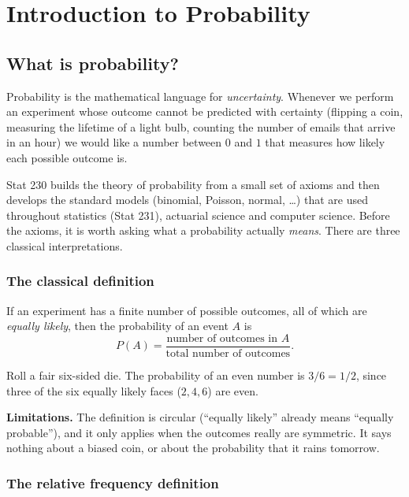 \chapter{Introduction to Probability}

\section{What is probability?}

Probability is the mathematical language for \emph{uncertainty}. Whenever we perform an
experiment whose outcome cannot be predicted with certainty (flipping a coin, measuring
the lifetime of a light bulb, counting the number of emails that arrive in an hour) we
would like a number between $0$ and $1$ that measures how likely each possible outcome is.

Stat 230 builds the theory of probability from a small set of axioms and then develops
the standard models (binomial, Poisson, normal, \dots) that are used throughout
statistics (Stat 231), actuarial science and computer science. Before the axioms, it is
worth asking what a probability actually \emph{means}. There are three classical
interpretations.

\subsection{The classical definition}

\begin{definition}
If an experiment has a finite number of possible outcomes, all of which are \emph{equally
likely}, then the probability of an event $A$ is
\[
  P(A) = \frac{\text{number of outcomes in } A}{\text{total number of outcomes}}.
\]
\end{definition}

\begin{example}
Roll a fair six-sided die. The probability of an even number is $3/6 = 1/2$, since three
of the six equally likely faces ($2,4,6$) are even.
\end{example}

\textbf{Limitations.} The definition is circular (``equally likely'' already means
``equally probable''), and it only applies when the outcomes really are symmetric. It
says nothing about a biased coin, or about the probability that it rains tomorrow.

\subsection{The relative frequency definition}

